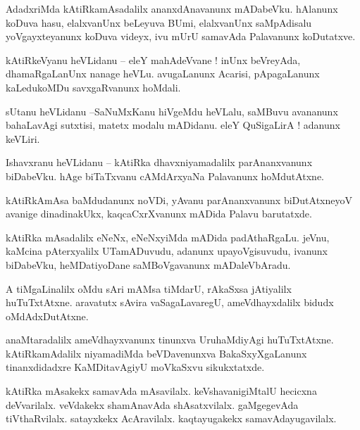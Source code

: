 \documentclass{article}
\begin{document}
\begin{mn}%
AdadxriMda kAtiRkamAsadalilx ananxdAnavanunx mADabeVku. hAlanunx koDuva hasu, elalxvanUnx beLeyuva 
BUmi, elalxvanUnx saMpAdisalu yoVgayxteyanunx koDuva videyx, ivu mUrU samavAda Palavanunx 
koDutatxve.
\end{mn}

\begin{mn}%
kAtiRkeVyanu heVLidanu -- eleY mahAdeVvane ! inUnx beVreyAda, dhamaRgaLanUnx nanage heVLu. 
avugaLanunx Acarisi, pApagaLanunx kaLedukoMDu savxgaRvanunx hoMdali.
\end{mn}

\begin{mn}%
sUtanu heVLidanu --SaNuMxKanu hiVgeMdu heVLalu, saMBuvu avananunx bahaLavAgi sutxtisi, matetx 
modalu mADidanu. eleY QuSigaLirA ! adanunx keVLiri.
\end{mn}

\begin{mn}%
Ishavxranu heVLidanu -- kAtiRka dhavxniyamadalilx parAnanxvanunx biDabeVku. hAge biTaTxvanu 
cAMdArxyaNa Palavanunx hoMdutAtxne.
\end{mn}

\begin{mn}%
kAtiRkAmAsa baMdudanunx noVDi, yAvanu parAnanxvanunx biDutAtxneyoV avanige dinadinakUkx, 
kaqcaCxrXvanunx mADida Palavu barutatxde.
\end{mn}

\begin{mn}%
kAtiRka mAsadalilx eNeNx, eNeNxyiMda mADida padAthaRgaLu. jeVnu, kaMcina pAterxyalilx UTamADuvudu, 
adanunx upayoVgisuvudu, ivanunx biDabeVku, heMDatiyoDane saMBoVgavanunx mADaleVbAradu.
\end{mn}

\begin{mn}%
A tiMgaLinalilx oMdu sAri mAMsa tiMdarU, rAkaSxsa jAtiyalilx huTuTxtAtxne. aravatutx sAvira 
vaSagaLavaregU, ameVdhayxdalilx bidudx oMdAdxDutAtxne.
\end{mn}

\begin{mn}%
anaMtaradalilx ameVdhayxvanunx tinunxva UruhaMdiyAgi huTuTxtAtxne. kAtiRkamAdalilx niyamadiMda 
beVDavenunxva BakaSxyXgaLanunx tinanxdidadxre KaMDitavAgiyU moVkaSxvu sikukxtatxde.
\end{mn}

\begin{mn}%
kAtiRka mAsakekx samavAda mAsavilalx. keVshavanigiMtalU hecicxna deVvarilalx. veVdakekx 
shamAnavAda shAsatxvilalx. gaMgegevAda tiVthaRvilalx. satayxkekx AcAravilalx. kaqtayugakekx 
samavAdayugavilalx.
\end{mn}
\end{document}
